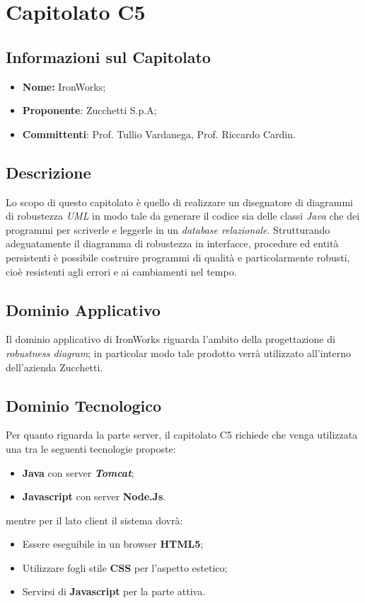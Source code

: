 \section{Capitolato C5}
\subsection{Informazioni sul Capitolato}
	\begin{itemize}
		\item \textbf{Nome:}
		IronWorks;
		\item \textbf{Proponente}:
		Zucchetti S.p.A;
		\item \textbf{Committenti}:
		Prof. Tullio Vardanega, Prof. Riccardo Cardin.
	\end{itemize}

\subsection{Descrizione}
	Lo scopo di questo capitolato è quello di realizzare un disegnatore di diagrammi di robustezza \textit{UML} in modo tale da generare il codice sia delle classi \textit{Java} che dei programmi per scriverle e leggerle in un \textit{database relazionale}.
	\newline \newline Strutturando adeguatamente il diagramma di robustezza in interfacce, procedure ed entità persistenti è possibile costruire programmi di qualità e particolarmente robusti, cioè resistenti agli errori e ai cambiamenti nel tempo.
	
\subsection{Dominio Applicativo}
	Il dominio applicativo di IronWorks riguarda l'ambito della progettazione di \textit{robustness diagram}; in particolar modo tale prodotto verrà utilizzato all'interno dell'azienda Zucchetti.
	
\subsection{Dominio Tecnologico}
	Per quanto riguarda la parte server, il capitolato C5 richiede che venga utilizzata una tra le seguenti tecnologie proposte:
	\begin{itemize}
		\item \textbf{Java} con server \textit{\textbf{Tomcat}};
		\item \textbf{Javascript} con server \textbf{Node.Js}.
	\end{itemize}
	mentre per il lato client il sistema dovrà:
	\begin{itemize}
		\item Essere eseguibile in un browser \textbf{HTML5};
		\item Utilizzare fogli stile \textbf{CSS} per l’aspetto estetico;
		\item Servirsi di \textbf{Javascript} per la parte attiva.
	\end{itemize}
	
